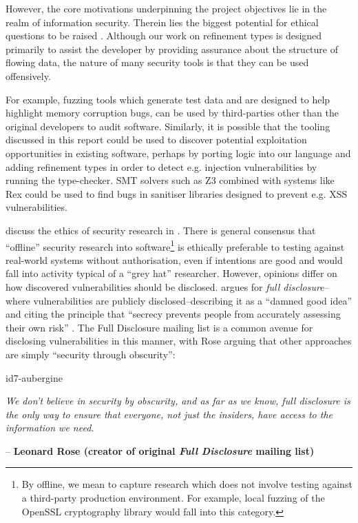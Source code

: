 \documentclass[a4paper,openany,12pt]{book}
\begin{document}
However, the core motivations underpinning the project objectives lie in the realm of information security.
Therein lies the biggest potential for ethical questions to be raised \citep{dark2008ethics}.
Although our work on refinement types is designed primarily to assist the developer by providing assurance about the
structure of flowing data, the nature of many security tools is that they can be used offensively.

For example, fuzzing tools which generate test data and are designed to help highlight memory corruption bugs, can be
used by third-parties other than the original developers to audit software.
Similarly, it is possible that the tooling discussed in this report could be used to discover potential exploitation
opportunities in existing software, perhaps by porting logic into our language and adding refinement types in order to
detect e.g. injection vulnerabilities by running the type-checker.
SMT solvers such as Z3 combined with systems like Rex could be used to find bugs in sanitiser libraries designed to
prevent e.g. XSS vulnerabilities.

\citeauthor{harper2018gray} discuss the ethics of security research in \citet{harper2018gray}.
There is general consensus that ``offline'' security research into software\footnote{By offline, we mean to capture research which does not involve testing against a third-party production environment.
For example, local fuzzing of the OpenSSL cryptography library would fall into this category.} is ethically preferable
to testing against real-world systems without authorisation, even if intentions are good and would fall into activity
typical of a ``grey hat'' researcher.
However, opinions differ on how discovered vulnerabilities should be disclosed. \citeauthor{schneier2007fd} argues for
\textit{full disclosure}--where vulnerabilities are publicly disclosed--describing it as a ``damned good
idea'' and citing the principle that ``secrecy prevents people from accurately assessing their own risk'' \citep{schneier2007fd}.
The Full Disclosure mailing list is a common avenue for disclosing vulnerabilities in this manner, with Rose arguing
that other approaches are simply ``security through obscurity'':

\begin{mdframed}
    \begin{leftbar}{id7-aubergine}
        \vspace{0.25em}

        \textit{We don't believe in security by obscurity, and as far as we know, full disclosure is the only way to ensure that everyone, not just the insiders, have access to the information we need.} \\
        \vspace{0.25em}
    \end{leftbar}
    \vspace{-0.2em}
    \hfill \textcolor{id7-aubergine}{\Small \sffamily -- \textbf{Leonard Rose (creator of original \textit{Full Disclosure} mailing list)}}
    \rmfamily
\end{mdframed}
\end{document}
